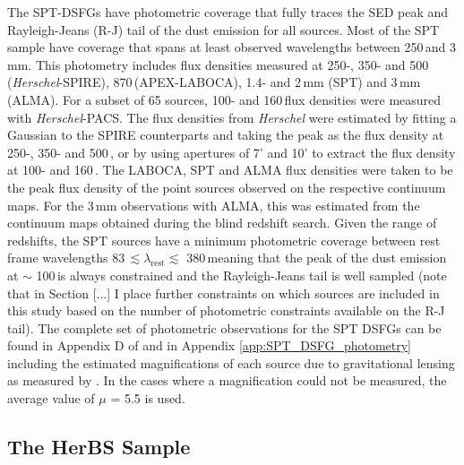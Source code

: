 The SPT-DSFGs have photometric coverage that fully traces the SED peak and Rayleigh-Jeans (R-J) tail of the dust emission for all sources. Most of the SPT sample have coverage that spans at least observed wavelengths between 250\,\micron and 3\,mm. This photometry includes flux densities measured at 250-, 350- and 500\,\micron (\textit{Herschel}-SPIRE), 870\,\micron (APEX-LABOCA), 1.4- and 2\,mm (SPT) and 3\,mm (ALMA). For a subset of 65 sources, 100- and 160\,\micron flux densities were measured with \textit{Herschel}-PACS. The flux densities from \textit{Herschel} were estimated by fitting a Gaussian to the SPIRE counterparts and taking the peak as the flux density at 250-, 350- and 500\,\micron, or by using apertures of 7' and 10' to extract the flux density at 100- and 160\,\micron. The LABOCA, SPT and ALMA flux densities were taken to be the peak flux density of the point sources observed on the respective continuum maps. For the 3\,mm observations with ALMA, this was estimated from the continuum maps obtained during the blind redshift search. Given the range of redshifts, the SPT sources have a minimum photometric coverage between rest frame wavelengths 83\,\micron $\lesssim \lambda_{\textrm{rest}} \lesssim$ 380\,\micron meaning that the peak of the dust emission at $\sim$ 100\,\micron is always constrained and the Rayleigh-Jeans tail is well sampled (note that in Section [...] I place further constraints on which sources are included in this study based on the number of photometric constraints available on the R-J tail). The complete set of photometric observations for the SPT DSFGs can be found in Appendix D of \citealt{Reuter_2020} and in Appendix \ref{app:SPT_DSFG_photometry} including the estimated magnifications of each source due to gravitational lensing as measured by \citealt{Spilker_2016}. In the cases where a magnification could not be measured, the average value of $\mu$ = 5.5 is used.

\subsection{The HerBS Sample}

